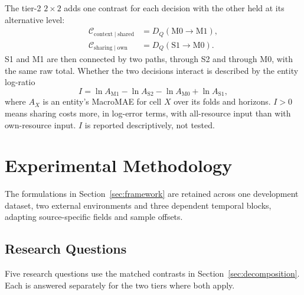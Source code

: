 \documentclass[5p,twocolumn]{elsarticle}
\begin{document}
The tier-2 $2\times2$ adds one contrast for each decision with the other
held at its alternative level:
\begin{equation}
  \begin{aligned}
    \mathcal{C}_{\mathrm{context}\mid\mathrm{shared}}
      &= D_Q(\mathrm{M0}\rightarrow\mathrm{M1}), \\
    \mathcal{C}_{\mathrm{sharing}\mid\mathrm{own}}
      &= D_Q(\mathrm{S1}\rightarrow\mathrm{M0}).
  \end{aligned}
  \label{eq:tier2-contrasts}
\end{equation}
S1 and M1 are then connected by two paths, through S2 and through M0, with
the same raw total. Whether the two decisions interact is described by the
entity log-ratio
\begin{equation}
  I=\ln A_{\mathrm{M1}}-\ln A_{\mathrm{S2}}-\ln A_{\mathrm{M0}}
    +\ln A_{\mathrm{S1}},
  \label{eq:interaction}
\end{equation}
where $A_X$ is an entity's MacroMAE for cell $X$ over its folds and horizons.
$I>0$ means sharing costs more, in log-error terms, with all-resource input
than with own-resource input. $I$ is reported descriptively, not tested.

\section{Experimental Methodology}
\label{sec:methodology}

The formulations in Section~\ref{sec:framework} are retained across one
development dataset, two external environments and three dependent temporal
blocks, adapting source-specific fields and sample offsets.

\subsection{Research Questions}
\label{sec:research-questions}

Five research questions use the matched contrasts in
Section~\ref{sec:decomposition}. Each is answered separately for the two
tiers where both apply.
\end{document}
